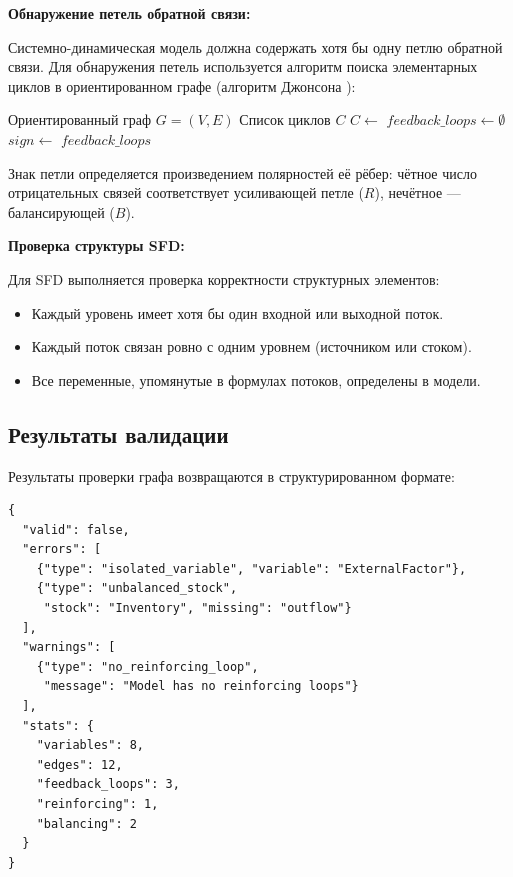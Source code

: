 \textbf{Обнаружение петель обратной связи:}

Системно-динамическая модель должна содержать хотя бы одну петлю обратной связи. Для обнаружения петель используется алгоритм поиска элементарных циклов в ориентированном графе (алгоритм Джонсона \cite{johnson1975finding}):

\begin{algorithm}[H]
    \caption{Обнаружение петель обратной связи}
    \begin{algorithmic}[1]
        \Require Ориентированный граф $G = (V, E)$
        \Ensure Список циклов $C$
        \State $C \gets$  
        \State $feedback\_loops \gets \emptyset$
            \State $sign \gets$ 
            \State {}
        \EndFor
        \State \Return $feedback\_loops$
    \end{algorithmic}
\end{algorithm}

Знак петли определяется произведением полярностей её рёбер: чётное число отрицательных связей соответствует усиливающей петле ($R$), нечётное --- балансирующей ($B$).

\textbf{Проверка структуры SFD:}

Для SFD выполняется проверка корректности структурных элементов:

\begin{itemize}
    \item Каждый уровень имеет хотя бы один входной или выходной поток.
    \item Каждый поток связан ровно с одним уровнем (источником или стоком).
    \item Все переменные, упомянутые в формулах потоков, определены в модели.
\end{itemize}

\subsection{Результаты валидации}

Результаты проверки графа возвращаются в структурированном формате:

\begin{lstlisting}[caption={Формат результата валидации}]
{
  "valid": false,
  "errors": [
    {"type": "isolated_variable", "variable": "ExternalFactor"},
    {"type": "unbalanced_stock",
     "stock": "Inventory", "missing": "outflow"}
  ],
  "warnings": [
    {"type": "no_reinforcing_loop",
     "message": "Model has no reinforcing loops"}
  ],
  "stats": {
    "variables": 8,
    "edges": 12,
    "feedback_loops": 3,
    "reinforcing": 1,
    "balancing": 2
  }
}
\end{lstlisting}

